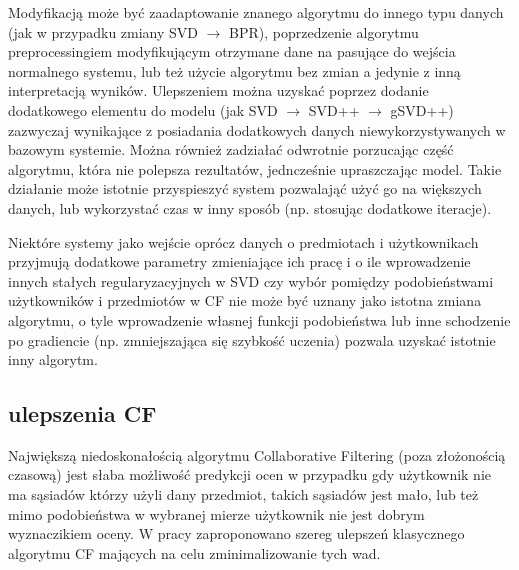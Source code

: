 \documentclass{pracamgr}
\begin{document}
   Modyfikacją może być zaadaptowanie znanego algorytmu do innego typu danych (jak w przypadku zmiany SVD $\rightarrow$ BPR),
   poprzedzenie algorytmu preprocessingiem modyfikującym otrzymane dane na pasujące do wejścia normalnego systemu,
   lub też użycie algorytmu bez zmian a jedynie z inną interpretacją wyników.
   Ulepszeniem można uzyskać poprzez dodanie dodatkowego elementu do modelu (jak SVD $\rightarrow$ SVD++ $\rightarrow$ gSVD++)
   zazwyczaj wynikające z posiadania dodatkowych danych niewykorzystywanych w bazowym systemie.
   Można również zadziałać odwrotnie porzucając część algorytmu, która nie polepsza rezultatów, jedncześnie upraszczając model.
   Takie działanie może istotnie przyspieszyć system pozwalająć użyć go na większych danych, lub wykorzystać czas w inny sposób
   (np. stosując dodatkowe iteracje).
   
   Niektóre systemy jako wejście oprócz danych o predmiotach i użytkownikach przyjmują dodatkowe parametry zmieniające ich pracę i o ile
   wprowadzenie innych stałych regularyzacyjnych w SVD czy wybór pomiędzy podobieństwami użytkowników i przedmiotów w CF nie może być uznany jako
   istotna zmiana algorytmu, o tyle wprowadzenie własnej funkcji podobieństwa lub inne schodzenie po gradiencie (np. zmniejszająca się szybkość uczenia)
   pozwala uzyskać istotnie inny algorytm.

   
   
   \subsection{ulepszenia CF}
    Największą niedoskonałością algorytmu Collaborative Filtering (poza złożonością czasową) jest słaba możliwość predykcji ocen w przypadku gdy użytkownik nie
    ma sąsiadów którzy użyli dany przedmiot, takich sąsiadów jest mało,
    lub też mimo podobieństwa w wybranej mierze użytkownik nie jest dobrym wyznaczikiem oceny.\newline
    W pracy \cite{221} zaproponowano szereg ulepszeń klasycznego algorytmu CF mających na celu zminimalizowanie tych wad.
\end{document}

